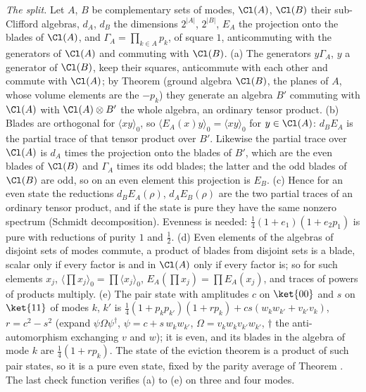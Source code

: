 \emph{The split.} Let $A$, $B$ be complementary sets of modes, $\Cl(A)$, $\Cl(B)$ their sub-Clifford algebras, $d_{A}$, $d_{B}$ the dimensions $2^{|A|}$, $2^{|B|}$, $E_{A}$ the projection onto the blades of $\Cl(A)$, and $\Gamma_{A} = \prod_{k \in A}p_{k}$, of square $1$, anticommuting with the generators of $\Cl(A)$ and commuting with $\Cl(B)$. (a) The generators $y\Gamma_{A}$, $y$ a generator of $\Cl(B)$, keep their squares, anticommute with each other and commute with $\Cl(A)$; by Theorem  (ground algebra $\Cl(B)$, the planes of $A$, whose volume elements are the $-p_{k}$) they generate an algebra $B'$ commuting with $\Cl(A)$ with $\Cl(A) \otimes B'$ the whole algebra, an ordinary tensor product. (b) Blades are orthogonal for $\langle xy\rangle_{0}$, so $\langle E_{A}(x)y\rangle_{0} = \langle xy\rangle_{0}$ for $y \in \Cl(A)$: $d_{B}E_{A}$ is the partial trace of that tensor product over $B'$. Likewise the partial trace over $\Cl(A)$ is $d_{A}$ times the projection onto the blades of $B'$, which are the even blades of $\Cl(B)$ and $\Gamma_{A}$ times its odd blades; the latter and the odd blades of $\Cl(B)$ are odd, so on an even element this projection is $E_{B}$. (c) Hence for an even state the reductions $d_{B}E_{A}(\rho)$, $d_{A}E_{B}(\rho)$ are the two partial traces of an ordinary tensor product, and if the state is pure they have the same nonzero spectrum (Schmidt decomposition). Evenness is needed: $\tfrac14(1 + e_{1})(1 + e_{2}p_{1})$ is pure with reductions of purity $1$ and $\tfrac12$. (d) Even elements of the algebras of disjoint sets of modes commute, a product of blades from disjoint sets is a blade, scalar only if every factor is and in $\Cl(A)$ only if every factor is; so for such elements $x_{j}$, $\langle\prod x_{j}\rangle_{0} = \prod\langle x_{j}\rangle_{0}$, $E_{A}(\prod x_{j}) = \prod E_{A}(x_{j})$, and traces of powers of products multiply. (e) The pair state with amplitudes $c$ on $\ket{00}$ and $s$ on $\ket{11}$ of modes $k$, $k'$ is $\tfrac14(1 + p_{k}p_{k'})(1 + rp_{k}) + cs(w_{k}w_{k'} + v_{k'}v_{k})$, $r = c^{2} - s^{2}$ (expand $\psi\Omega\psi^{\dagger}$, $\psi = c + s\,w_{k}w_{k'}$, $\Omega = v_{k}w_{k}v_{k'}w_{k'}$, $\dagger$ the anti-automorphism exchanging $v$ and $w$); it is even, and its blades in the algebra of mode $k$ are $\tfrac14(1 + rp_{k})$. The state of the eviction theorem is a product of such pair states, so it is a pure even state, fixed by the parity average of Theorem . The last check function verifies (a) to (e) on three and four modes.

